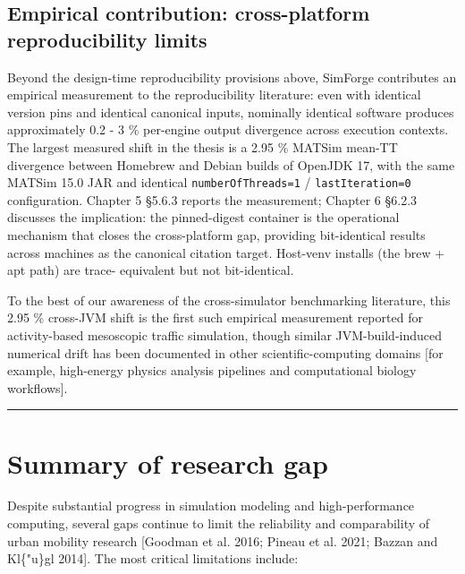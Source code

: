 \subsection{Empirical contribution: cross-platform reproducibility
limits}\label{271-empirical-contribution-cross-platform-reproducibility-limits}

Beyond the design-time reproducibility provisions above, SimForge
contributes an empirical measurement to the reproducibility literature:
even with identical version pins and identical canonical inputs,
nominally identical software produces approximately 0.2 - 3 \%
per-engine output divergence across execution contexts. The largest
measured shift in the thesis is a 2.95 \% MATSim mean-TT divergence
between Homebrew and Debian builds of OpenJDK 17, with the same MATSim
15.0 JAR and identical \texttt{numberOfThreads=1} /
\texttt{lastIteration=0} configuration. Chapter 5 §5.6.3 reports the
measurement; Chapter 6 §6.2.3 discusses the implication: the
pinned-digest container is the operational mechanism that closes the
cross-platform gap, providing bit-identical results across machines as
the canonical citation target. Host-venv installs (the brew + apt path)
are trace- equivalent but not bit-identical.

To the best of our awareness of the cross-simulator benchmarking
literature, this 2.95 \% cross-JVM shift is the first such empirical
measurement reported for activity-based mesoscopic traffic simulation,
though similar JVM-build-induced numerical drift has been documented in
other scientific-computing domains {[}for example, high-energy physics
analysis pipelines and computational biology workflows{]}.

\begin{center}\rule{0.5\linewidth}{0.5pt}\end{center}

\section{Summary of research gap}\label{28-summary-of-research-gap}

Despite substantial progress in simulation modeling and high-performance
computing, several gaps continue to limit the reliability and
comparability of urban mobility research {[}Goodman et al. 2016; Pineau
et al. 2021; Bazzan and Kl\{"u\}gl 2014{]}. The most critical
limitations include:

